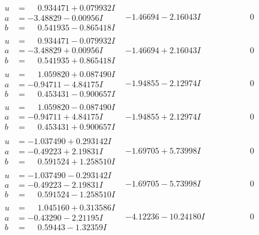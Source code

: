 \documentclass[1p]{elsarticle_modified}
\theoremstyle{definition}
\begin{document}
$$\begin{array}{c|c|c}
\begin{aligned}
u &= \phantom{-}0.934471 + 0.079932 I \\
a &= -3.48829 - 0.00956 I \\
b &= \phantom{-}0.541935 - 0.865418 I\end{aligned}
 & -1.46694 - 2.16043 I & \phantom{-0.000000 } 0 \\ \hline\begin{aligned}
u &= \phantom{-}0.934471 - 0.079932 I \\
a &= -3.48829 + 0.00956 I \\
b &= \phantom{-}0.541935 + 0.865418 I\end{aligned}
 & -1.46694 + 2.16043 I & \phantom{-0.000000 } 0 \\ \hline\begin{aligned}
u &= \phantom{-}1.059820 + 0.087490 I \\
a &= -0.94711 - 4.84175 I \\
b &= \phantom{-}0.453431 - 0.900657 I\end{aligned}
 & -1.94855 - 2.12974 I & \phantom{-0.000000 } 0 \\ \hline\begin{aligned}
u &= \phantom{-}1.059820 - 0.087490 I \\
a &= -0.94711 + 4.84175 I \\
b &= \phantom{-}0.453431 + 0.900657 I\end{aligned}
 & -1.94855 + 2.12974 I & \phantom{-0.000000 } 0 \\ \hline\begin{aligned}
u &= -1.037490 + 0.293142 I \\
a &= -0.49223 + 2.19831 I \\
b &= \phantom{-}0.591524 + 1.258510 I\end{aligned}
 & -1.69705 + 5.73998 I & \phantom{-0.000000 } 0 \\ \hline\begin{aligned}
u &= -1.037490 - 0.293142 I \\
a &= -0.49223 - 2.19831 I \\
b &= \phantom{-}0.591524 - 1.258510 I\end{aligned}
 & -1.69705 - 5.73998 I & \phantom{-0.000000 } 0 \\ \hline\begin{aligned}
u &= \phantom{-}1.045160 + 0.313586 I \\
a &= -0.43290 - 2.21195 I \\
b &= \phantom{-}0.59443 - 1.32359 I\end{aligned}
 & -4.12236 - 10.24180 I & \phantom{-0.000000 } 0 \\ \hline\begin{aligned}

\end{aligned}
\end{array}$$
\end{document}
